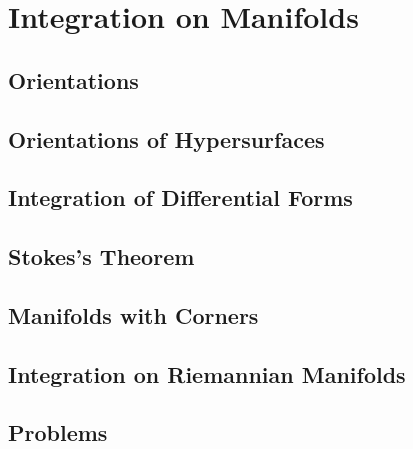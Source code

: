 \chapter{Integration on Manifolds}
\section{Orientations}
\section{Orientations of Hypersurfaces}
\section{Integration of Differential Forms}
\section{Stokes's Theorem}
\section{Manifolds with Corners}
\section{Integration on Riemannian Manifolds}
\section{Problems}

